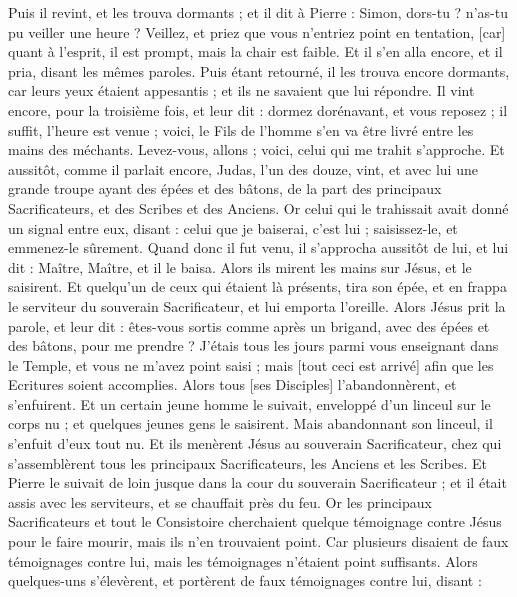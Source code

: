 \begin{multicols}{2}
Puis il revint, et les trouva dormants ; et il dit à Pierre : Simon, dors-tu ? n'as-tu pu veiller une heure ?
Veillez, et priez que vous n'entriez point en tentation, [car] quant à l'esprit, il est prompt, mais la chair est faible.
Et il s'en alla encore, et il pria, disant les mêmes paroles.
Puis étant retourné, il les trouva encore dormants, car leurs yeux étaient appesantis ; et ils ne savaient que lui répondre.
Il vint encore, pour la troisième fois, et leur dit : dormez dorénavant, et vous reposez ; il suffit, l'heure est venue ; voici, le Fils de l'homme s'en va être livré entre les mains des méchants.
Levez-vous, allons ; voici, celui qui me trahit s'approche.
Et aussitôt, comme il parlait encore, Judas, l'un des douze, vint, et avec lui une grande troupe ayant des épées et des bâtons, de la part des principaux Sacrificateurs, et des Scribes et des Anciens.
Or celui qui le trahissait avait donné un signal entre eux, disant : celui que je baiserai, c’est lui ; saisissez-le, et emmenez-le sûrement.
Quand donc il fut venu, il s'approcha aussitôt de lui, et lui dit : Maître, Maître, et il le baisa.
Alors ils mirent les mains sur Jésus, et le saisirent.
Et quelqu'un de ceux qui étaient là présents, tira son épée, et en frappa le serviteur du souverain Sacrificateur, et lui emporta l'oreille.
Alors Jésus prit la parole, et leur dit : êtes-vous sortis comme après un brigand, avec des épées et des bâtons, pour me prendre ?
J’étais tous les jours parmi vous enseignant dans le Temple, et vous ne m'avez point saisi ; mais [tout ceci est arrivé] afin que les Ecritures soient accomplies.
Alors tous [ses Disciples] l'abandonnèrent, et s'enfuirent.
Et un certain jeune homme le suivait, enveloppé d'un linceul sur le corps nu ; et quelques jeunes gens le saisirent.
Mais abandonnant son linceul, il s'enfuit d'eux tout nu.
Et ils menèrent Jésus au souverain Sacrificateur, chez qui s'assemblèrent tous les principaux Sacrificateurs, les Anciens et les Scribes.
Et Pierre le suivait de loin jusque dans la cour du souverain Sacrificateur ; et il était assis avec les serviteurs, et se chauffait près du feu.
Or les principaux Sacrificateurs et tout le Consistoire cherchaient quelque témoignage contre Jésus pour le faire mourir, mais ils n'en trouvaient point.
Car plusieurs disaient de faux témoignages contre lui, mais les témoignages n'étaient point suffisants.
Alors quelques-uns s'élevèrent, et portèrent de faux témoignages contre lui, disant :

\end{multicols}
